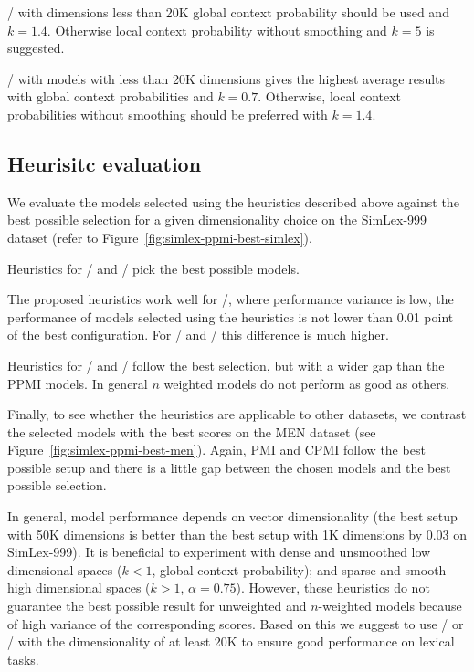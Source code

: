 \documentclass[11pt,letterpaper]{article}
\begin{document}
\NSCPMI/ with dimensions less than 20K global context probability should be used and $k = 1.4$. Otherwise local context probability without smoothing and $k = 5$ is suggested.

\logNSCPMI/ with models with less than 20K dimensions gives the highest average results with global context probabilities and $k = 0.7$. Otherwise, local context probabilities without smoothing should be preferred with $k = 1.4$.


\subsection{Heurisitc evaluation}
\label{sec:heurisitc-evaluation}

We evaluate the models selected using the heuristics described above against the best possible selection for a given dimensionality choice on the SimLex-999 dataset (refer to Figure~\ref{fig:simlex-ppmi-best-simlex}).

Heuristics for \logNPMI/ and \logNCPMI/ pick the best possible models.

The proposed heuristics work well for \logNSPMI/, where performance variance is low, the performance of models selected using the heuristics is not lower than 0.01 point of the best configuration. For \SPMI/ and \NSPMI/ this difference is much higher.

Heuristics for \logNCPMI/ and \CPMI/ follow the best selection, but with a wider gap than the PPMI models. In general $n$ weighted models do not perform as good as others.

Finally, to see whether the heuristics are applicable to other datasets, we contrast the selected models with the best scores on the MEN dataset (see Figure~\ref{fig:simlex-ppmi-best-men}). Again, PMI and CPMI follow the best possible setup and there is a little gap between the chosen models and the best possible selection.

In general, model performance depends on vector dimensionality (the best setup with 50K dimensions is better than the best setup with 1K dimensions by 0.03 on SimLex-999). It is beneficial to experiment with dense and unsmoothed low dimensional spaces ($k < 1$, global context probability); and sparse and smooth high dimensional spaces ($k > 1$, $\alpha = 0.75$). However, these heuristics do not guarantee the best possible result for unweighted and $n$-weighted models because of high variance of the corresponding scores. Based on this we suggest to use \logNSPMI/ or \logNSCPMI/ with the dimensionality of at least 20K to ensure good performance on lexical tasks.






%
% 

\balance

\end{document}
